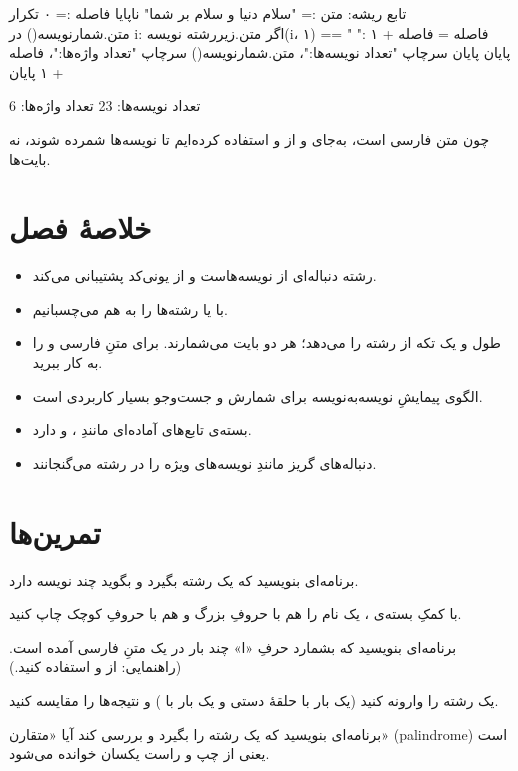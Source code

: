 \begin{salamfa}
تابع ریشه:
    متن := "سلام دنیا و سلام بر شما"
    ناپایا فاصله := ۰
    تکرار متن.شمارنویسه() در i:
        اگر متن.زیررشته نویسه(i، ۱) == " ":
            فاصله = فاصله + ۱
        پایان
    پایان
    سرچاپ "تعداد نویسه‌ها:"، متن.شمارنویسه()
    سرچاپ "تعداد واژه‌ها:"، فاصله + ۱
پایان
\end{salamfa}

\begin{progoutfa}
تعداد نویسه‌ها: 23
تعداد واژه‌ها: 6
\end{progoutfa}

چون متن فارسی است، به‌جای  و  از 
و  استفاده کرده‌ایم تا نویسه‌ها شمرده شوند، نه بایت‌ها.

\section{خلاصهٔ فصل}

\begin{itemize}
  \item رشته دنباله‌ای از نویسه‌هاست و از یونی‌کد پشتیبانی می‌کند.
  \item با \code{+} یا  رشته‌ها را به هم می‌چسبانیم.
  \item {} طول و  یک تکه از رشته را می‌دهد؛
        هر دو بایت می‌شمارند. برای متنِ فارسی  و
         را به کار ببرید.
  \item الگوی پیمایشِ نویسه‌به‌نویسه برای شمارش و جست‌وجو بسیار کاربردی است.
  \item بسته‌ی  تابع‌های آماده‌ای مانندِ ،  و
         دارد.
  \item دنباله‌های گریز مانندِ  نویسه‌های ویژه
        را در رشته می‌گنجانند.
\end{itemize}

\section{تمرین‌ها}

\exercise برنامه‌ای بنویسید که یک رشته بگیرد و بگوید چند نویسه دارد.

\exercise با کمکِ بسته‌ی ، یک نام را هم با حروفِ بزرگ و هم با حروفِ
کوچک چاپ کنید.

\exercise برنامه‌ای بنویسید که بشمارد حرفِ «ا» چند بار در یک متنِ فارسی آمده
است. (راهنمایی: از  و  استفاده کنید.)

\exercise یک رشته را وارونه کنید (یک بار با حلقهٔ دستی و یک بار با
) و نتیجه‌ها را مقایسه کنید.

\exercise برنامه‌ای بنویسید که یک رشته را بگیرد و بررسی کند آیا «متقارن»
(palindrome) است یعنی از چپ و راست یکسان خوانده می‌شود.
